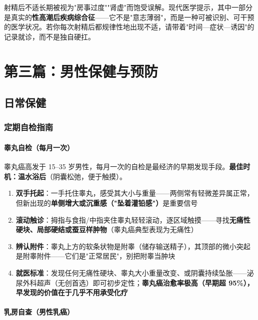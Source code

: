 \begin{tcolorbox}[colback=pink!5!white,colframe=red!50!black,title=贴心小叮咛]
射精后不适长期被视为"房事过度""肾虚"而饱受误解。现代医学提示，其中一部分是真实的\textbf{性高潮后疾病综合征}——它不是"意志薄弱"，而是一种可被识别、可干预的医学状况。若你每次射精后都规律性地出现不适，请带着"时间—症状—诱因"的记录就诊，而不是独自硬扛。
\end{tcolorbox}


\part{第三篇：男性保健与预防}

\chapter{日常保健}

\section{定期自检指南}
\subsection{睾丸自检（每月一次）}


睾丸癌高发于 15--35 岁男性，每月一次的自检是最经济的早期发现手段。\textbf{最佳时机：温水浴后}（阴囊松弛，便于触摸）。

\begin{enumerate}
	\item \textbf{双手托起}：一手托住睾丸，感受其大小与重量——两侧常有轻微差异属正常，但新出现的\textbf{单侧增大或沉重感（"坠着灌铅感"）}是重要信号
	\item \textbf{滚动触诊}：拇指与食指/中指夹住睾丸轻轻滚动，逐区域触摸——寻找\textbf{无痛性硬块、局部硬结或蚕豆样肿物}（睾丸癌典型表现为无痛性）
	\item \textbf{辨认附件}：睾丸上方的软条状物是附睾（储存输送精子），其顶部的微小突起是附睾附件——它们是"正常居民"，别把附睾当肿块
	\item \textbf{就医标准}：发现任何无痛性硬块、睾丸大小重量改变、或阴囊持续坠胀——泌尿外科超声（无创首选）即可初步定性；\textbf{睾丸癌治愈率极高（早期超 95\%），早发现的价值在于几乎不用承受化疗}
\end{enumerate}

\subsection{乳房自查（男性乳癌）}



